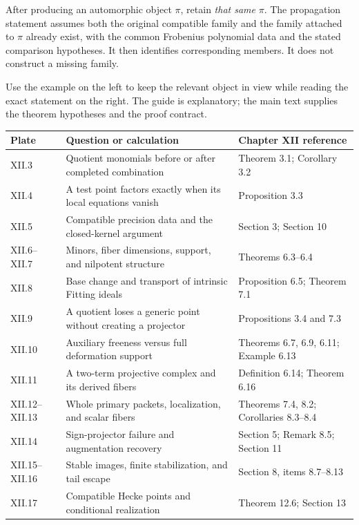 After producing an automorphic object $\pi$, retain \emph{that same} $\pi$. The propagation statement assumes both the original compatible family and the family attached to $\pi$ already exist, with the common Frobenius polynomial data and the stated comparison hypotheses. It then identifies corresponding members. It does not construct a missing family.


Use the example on the left to keep the relevant object in view while reading the exact statement on the right. The guide is explanatory; the main text supplies the theorem hypotheses and the proof contract.

{\small
\begin{tabularx}{\linewidth}{@{}p{.12\linewidth}Yp{.30\linewidth}@{}}\toprule
\textbf{Plate} & \textbf{Question or calculation} & \textbf{Chapter XII reference}\\\midrule
XII.3 & Quotient monomials before or after completed combination & Theorem 3.1; Corollary 3.2\\
XII.4 & A test point factors exactly when its local equations vanish & Proposition 3.3\\
XII.5 & Compatible precision data and the closed-kernel argument & Section 3; Section 10\\
XII.6--XII.7 & Minors, fiber dimensions, support, and nilpotent structure & Theorems 6.3--6.4\\
XII.8 & Base change and transport of intrinsic Fitting ideals & Proposition 6.5; Theorem 7.1\\
XII.9 & A quotient loses a generic point without creating a projector & Propositions 3.4 and 7.3\\
XII.10 & Auxiliary freeness versus full deformation support & Theorems 6.7, 6.9, 6.11; Example 6.13\\
XII.11 & A two-term projective complex and its derived fibers & Definition 6.14; Theorem 6.16\\
XII.12--XII.13 & Whole primary packets, localization, and scalar fibers & Theorems 7.4, 8.2; Corollaries 8.3--8.4\\
XII.14 & Sign-projector failure and augmentation recovery & Section 5; Remark 8.5; Section 11\\
XII.15--XII.16 & Stable images, finite stabilization, and tail escape & Section 8, items 8.7--8.13\\
XII.17 & Compatible Hecke points and conditional realization & Theorem 12.6; Section 13\\\bottomrule
\end{tabularx}}

